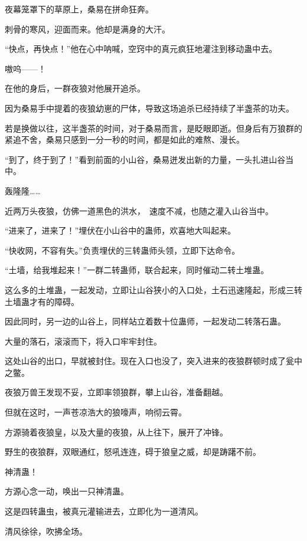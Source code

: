 
\begin{this_body}

夜幕笼罩下的草原上，桑易在拼命狂奔。

刺骨的寒风，迎面而来。他却是满身的大汗。

“快点，再快点！”他在心中呐喊，空窍中的真元疯狂地灌注到移动蛊中去。

嗷呜——！

在他的身后，一群夜狼对他展开追杀。

因为桑易手中提着的夜狼幼崽的尸体，导致这场追杀已经持续了半盏茶的功夫。

若是换做以往，这半盏茶的时间，对于桑易而言，是眨眼即逝。但身后有万狼群的紧追不舍，桑易只感到一分一秒的时间，都是如此的难熬、漫长。

“到了，终于到了！”看到前面的小山谷，桑易迸发出新的力量，一头扎进山谷当中。

轰隆隆……

近两万头夜狼，仿佛一道黑色的洪水，　速度不减，也随之灌入山谷当中。

“进来了，进来了！”埋伏在小山谷中的蛊师，欢喜地大叫起来。

“快收网，不容有失。”负责埋伏的三转蛊师头领，立即下达命令。

“土墙，给我堆起来！”一群二转蛊师，联合起来，同时催动二转土堆蛊。

这么多的土堆蛊，一起发动，立即让山谷狭小的入口处，土石迅速隆起，形成三转土墙蛊才有的障碍。

因此同时，另一边的山谷上，同样站立着数十位蛊师，一起发动二转落石蛊。

大量的落石，滚滚而下，将入口牢牢封住。

这处山谷的出口，早就被封住。现在入口也没了，突入进来的夜狼群顿时成了瓮中之鳖。

夜狼万兽王发现不妥，立即率领狼群，攀上山谷，准备翻越。

但就在这时，一声苍凉浩大的狼嚎声，响彻云霄。

方源骑着夜狼皇，以及大量的夜狼，从上往下，展开了冲锋。

野生的夜狼群，双眼通红，怒吼连连，碍于狼皇之威，却是踌躇不前。

神清蛊！

方源心念一动，唤出一只神清蛊。

这是四转蛊虫，被真元灌输进去，立即化为一道清风。

清风徐徐，吹拂全场。


\end{this_body}
